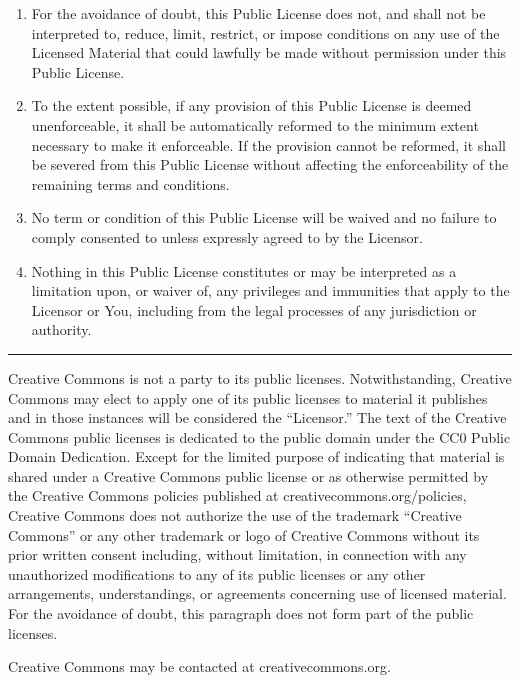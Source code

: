 \documentclass[
]{scrbook}
\begin{document}
\begin{enumerate}
\def\labelenumi{\alph{enumi}.}
\item
  For the avoidance of doubt, this Public License does not, and shall
  not be interpreted to, reduce, limit, restrict, or impose conditions
  on any use of the Licensed Material that could lawfully be made
  without permission under this Public License.
\item
  To the extent possible, if any provision of this Public License is
  deemed unenforceable, it shall be automatically reformed to the
  minimum extent necessary to make it enforceable. If the provision
  cannot be reformed, it shall be severed from this Public License
  without affecting the enforceability of the remaining terms and
  conditions.
\item
  No term or condition of this Public License will be waived and no
  failure to comply consented to unless expressly agreed to by the
  Licensor.
\item
  Nothing in this Public License constitutes or may be interpreted as a
  limitation upon, or waiver of, any privileges and immunities that
  apply to the Licensor or You, including from the legal processes of
  any jurisdiction or authority.
\end{enumerate}

\begin{center}\rule{0.5\linewidth}{0.5pt}\end{center}

Creative Commons is not a party to its public licenses. Notwithstanding,
Creative Commons may elect to apply one of its public licenses to
material it publishes and in those instances will be considered the
``Licensor.'' The text of the Creative Commons public licenses is
dedicated to the public domain under the CC0 Public Domain Dedication.
Except for the limited purpose of indicating that material is shared
under a Creative Commons public license or as otherwise permitted by the
Creative Commons policies published at creativecommons.org/policies,
Creative Commons does not authorize the use of the trademark ``Creative
Commons'' or any other trademark or logo of Creative Commons without its
prior written consent including, without limitation, in connection with
any unauthorized modifications to any of its public licenses or any
other arrangements, understandings, or agreements concerning use of
licensed material. For the avoidance of doubt, this paragraph does not
form part of the public licenses.

Creative Commons may be contacted at creativecommons.org.

\backmatter
\end{document}

